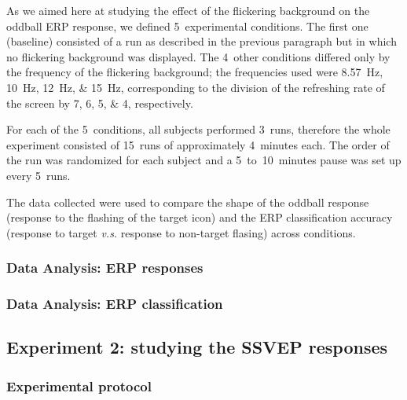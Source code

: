 \documentclass[10pt]{article}
\begin{document}
        As we aimed here at studying the effect of the flickering background on the oddball ERP response, we defined 5~experimental conditions.
        The first one (baseline) consisted of a run as described in the previous paragraph but in which no flickering background was displayed.
        The 4~other conditions differed only by the frequency of the flickering background; the frequencies used were \SIlist[list-units = single]{8.57;10;12;15}{\Hz}, corresponding to the division of the refreshing rate of the screen by \numlist{7;6;5;4}, respectively.

        For each of the 5~conditions, all subjects performed 3~runs, therefore the whole experiment consisted of 15~runs of approximately 4~minutes each.
        The order of the run was randomized for each subject and a 5~to~10~minutes pause was set up every 5~runs.

        The data collected were used to compare the shape of the oddball response (response to the flashing of the target icon) and the ERP classification accuracy (response to target \emph{v.s.} response to non-target flasing) across conditions.

        \subsubsection{Data Analysis: ERP responses}
        \label{sec:2.2.2AnalysisErpShape}



        \subsubsection{Data Analysis: ERP classification}
        \label{sec:2.2.3AnalysisErpClassification}



    \subsection{Experiment 2: studying the \acs{SSVEP} responses}
    \label{sec:2.3SSVEP}

        \subsubsection{Experimental protocol}
        \label{sec:2.3.1Protocol}
\end{document}
